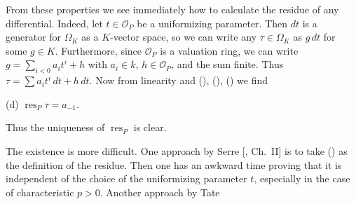 {From these properties we see immediately how to calculate the residue of any differential. Indeed, let $t\in\mathcal O_P$ be a uniformizing parameter. Then $dt$ is a generator for $\Omega_K$ as a $K$-vector space, so we can write any $\tau\in\Omega_K$ as $g\,dt$ for some $g\in K$. Furthermore, since $\mathcal O_P$ is a valuation ring, we can write $g=\sum_{i<0}a_i t^i+h$ with $a_i\in k$, $h\in\mathcal O_P$, and the sum finite. Thus $\tau=\sum a_i t^i\,dt+h\,dt$. Now from linearity and (), (), () we find

\hypertarget{result-III-7.14.1d}{}(d) $\operatorname{res}_P\tau=a_{-1}$.\par
\noindent Thus the uniqueness of $\operatorname{res}_P$ is clear.

The existence is more difficult. One approach by Serre [, Ch.~II] is to take () as the definition of the residue. Then one has an awkward time proving that it is independent of the choice of the uniformizing parameter $t$, especially in the case of characteristic $p>0$. Another approach by Tate 
}
